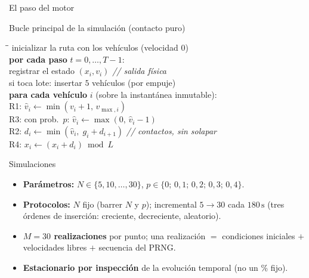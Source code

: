 \documentclass[10pt,aspectratio=169]{beamer}
\newcommand{\unit}[1]{\,\mathrm{#1}}
\begin{document}
\begin{frame}{El paso del motor}
\centering
{\small
\begin{block}{Bucle principal de la simulación (contacto puro)}
\begin{tabbing}
\quad\=\quad\=\kill
inicializar la ruta con los vehículos (velocidad $0$)\\[2pt]
\textbf{por cada paso} $t=0,\dots,T-1$:\\
\>registrar el estado $(x_i,v_i)$ \hfill\textit{// salida física}\\
\>[incremental] si toca lote: insertar $5$ vehículos (por empuje)\\
\>\textbf{para cada vehículo} $i$ (sobre la instantánea inmutable):\\
\>\>R1: $\hat v_i\leftarrow\min(v_i+1,\,v_{\max,i})$\\
\>\>R3: con prob.\ $p$: $\hat v_i\leftarrow\max(0,\,\hat v_i-1)$\\
\>R2: $d_i\leftarrow\min(\hat v_i,\;g_i+d_{i+1})$ \hfill\textit{// contactos, sin solapar}\\
\>R4: $x_i\leftarrow(x_i+d_i)\bmod L$
\end{tabbing}
\end{block}}
\end{frame}

\begin{frame}{Simulaciones}
\begin{itemize}
  \item \textbf{Parámetros:} $N\in\{5,10,\dots,30\}$, $p\in\{0;\,0{,}1;\,0{,}2;\,0{,}3;\,0{,}4\}$.
  \item \textbf{Protocolos:} $N$ fijo (barrer $N$ y $p$); incremental $5\to30$ cada $180\unit{s}$ (tres órdenes de inserción: creciente, decreciente, aleatorio).
  \item \textbf{$M=30$ realizaciones} por punto; una realización $=$ condiciones iniciales $+$ velocidades libres $+$ secuencia del PRNG.
  \item \textbf{Estacionario por inspección} de la evolución temporal (no un \% fijo).
\end{itemize}
\end{frame}
\end{document}
